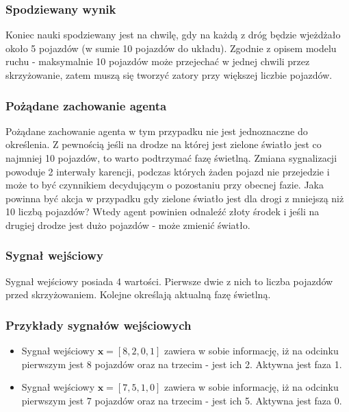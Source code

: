 \documentclass[12pt]{book}
\theoremstyle{plain}
\begin{document}
\subsubsection{Spodziewany wynik}
Koniec nauki spodziewany jest na chwilę, gdy na każdą z dróg będzie wjeżdżało około 5 pojazdów (w sumie 10 pojazdów do układu). Zgodnie z opisem modelu ruchu - maksymalnie 10 pojazdów może przejechać w jednej chwili przez skrzyżowanie, zatem muszą się tworzyć zatory przy większej liczbie pojazdów.
\subsubsection{Pożądane zachowanie agenta}
Pożądane zachowanie agenta w tym przypadku nie jest jednoznaczne do określenia. Z pewnością jeśli na drodze na której jest zielone światło jest co najmniej 10 pojazdów, to warto podtrzymać fazę świetlną. Zmiana sygnalizacji powoduje 2 interwały karencji, podczas których żaden pojazd nie przejedzie i może to być czynnikiem decydującym o pozostaniu przy obecnej fazie. Jaka powinna być akcja w przypadku gdy zielone światło jest dla drogi z mniejszą niż 10 liczbą pojazdów? Wtedy agent powinien odnaleźć złoty środek i jeśli na drugiej drodze jest dużo pojazdów - może zmienić światło.

\subsubsection*{Sygnał wejściowy}
Sygnał wejściowy posiada 4 wartości. Pierwsze dwie z nich to liczba pojazdów przed skrzyżowaniem. Kolejne określają aktualną fazę świetlną.
\subsubsection*{Przykłady sygnałów wejściowych}
\begin{itemize}
	\item Sygnał wejściowy $ \textbf{x}=[8,2,0,1] $ zawiera w sobie informację, iż na odcinku pierwszym jest 8 pojazdów oraz na trzecim - jest ich 2. Aktywna jest faza 1.
		\item Sygnał wejściowy $ \textbf{x}=[7,5,1,0] $ zawiera w sobie informację, iż na odcinku pierwszym jest 7 pojazdów oraz na trzecim - jest ich 5. Aktywna jest faza 0.
\end{itemize}
\end{document}
